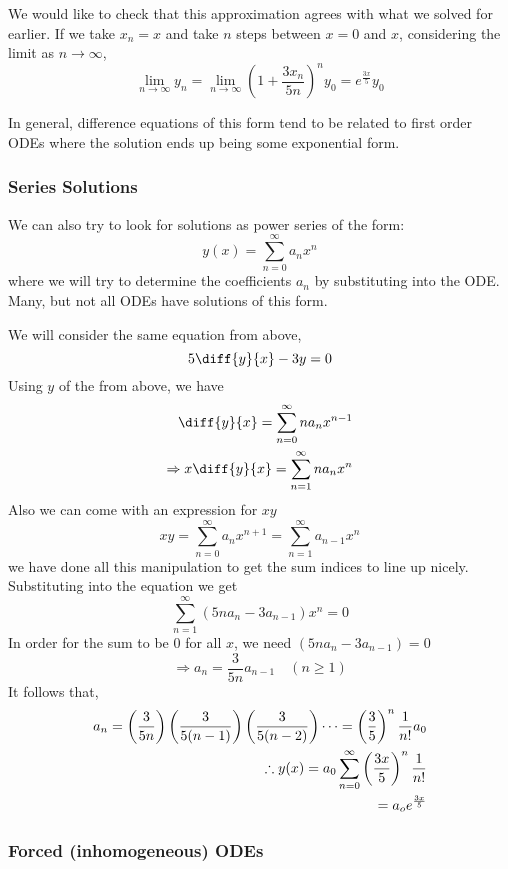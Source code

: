 \documentclass{article}
\begin{document}
We would like to check that this approximation agrees with what we solved for earlier. If we take $x_n = x$ and take $n$ steps between $x=0$ and $x$, considering the limit as $n \rightarrow \infty$,
\[
    \lim_{n \rightarrow \infty}y_n = \lim_{n \rightarrow \infty} (1 + \frac{3x_n}{5n})^ny_0 = e^{\frac{3x}{5}}y_0
\]

In general, difference equations of this form tend to be related to first order ODEs where the solution ends up being some exponential form.

\subsubsection{Series Solutions}

We can also try to look for solutions as power series of the form:
\[
    y(x) = \sum_{n=0}^{\infty}{a_nx^n}    
\]
where we will try to determine the coefficients $a_n$ by substituting into the ODE. Many, but not all ODEs have solutions of this form.

We will consider the same equation from above,
\[
    5 \diff{y}{x} - 3y = 0
\]
Using $y$ of the from above, we have
\begin{align*}
    \diff{y}{x} = \sum_{n=0}^{\infty}{na_nx^{n-1}} \\
    \Rightarrow x\diff{y}{x} = \sum_{n=1}^{\infty}{na_nx^{n}}
\end{align*}
Also we can come with an expression for $xy$
\[
    xy = \sum_{n=0}^{\infty}{a_nx^{n+1}} = \sum_{n=1}^{\infty}{a_{n-1}x^{n}}
\]
we have done all this manipulation to get the sum indices to line up nicely. Substituting into the equation we get
\[
    \sum_{n=1}^{\infty}(5na_n - 3a_{n-1})x^n = 0
\]
In order for the sum to be $0$ for all $x$, we need $(5na_n - 3a_{n-1}) = 0$
\[
    \Rightarrow a_n = \frac{3}{5n}a_{n-1} \quad (n \geq 1)
\]
It follows that,
\begin{align*}
    a_n = \left( \frac{3}{5n} \right)\left( \frac{3}{5(n-1)} \right)\left( \frac{3}{5(n-2)} \right)\cdots = \left( \frac{3}{5} \right)^n\frac{1}{n!}a_0 \\
    \therefore y(x) = a_0 \sum_{n=0}^{\infty}\left( \frac{3x}{5} \right)^n\frac{1}{n!} \\
    = a_o e^\frac{3x}{5}
\end{align*}


\subsubsection{Forced (inhomogeneous) ODEs}
\end{document}
